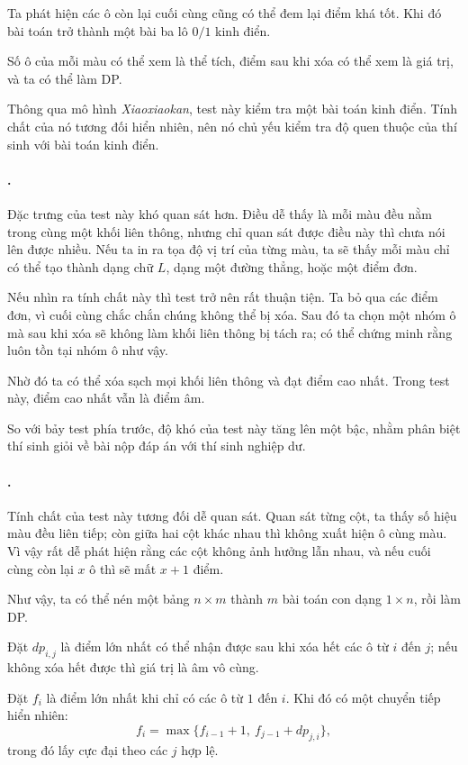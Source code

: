 \documentclass[11pt]{article}
\begin{document}
Ta phát hiện các ô còn lại cuối cùng cũng có thể đem lại điểm khá tốt. Khi đó
bài toán trở thành một bài ba lô \(0/1\) kinh điển.

Số ô của mỗi màu có thể xem là thể tích, điểm sau khi xóa có thể xem là giá
trị, và ta có thể làm DP.

Thông qua mô hình \emph{Xiaoxiaokan}, test này kiểm tra một bài toán kinh
điển. Tính chất của nó tương đối hiển nhiên, nên nó chủ yếu kiểm tra độ quen
thuộc của thí sinh với bài toán kinh điển.

\paragraph{.}
Đặc trưng của test này khó quan sát hơn. Điều dễ thấy là mỗi màu đều nằm trong
cùng một khối liên thông, nhưng chỉ quan sát được điều này thì chưa nói lên
được nhiều. Nếu ta in ra tọa độ vị trí của từng màu, ta sẽ thấy mỗi màu chỉ có
thể tạo thành dạng chữ \(L\), dạng một đường thẳng, hoặc một điểm đơn.

Nếu nhìn ra tính chất này thì test trở nên rất thuận tiện. Ta bỏ qua các điểm
đơn, vì cuối cùng chắc chắn chúng không thể bị xóa. Sau đó ta chọn một nhóm ô
mà sau khi xóa sẽ không làm khối liên thông bị tách ra; có thể chứng minh rằng
luôn tồn tại nhóm ô như vậy.

Nhờ đó ta có thể xóa sạch mọi khối liên thông và đạt điểm cao nhất. Trong test
này, điểm cao nhất vẫn là điểm âm.

So với bảy test phía trước, độ khó của test này tăng lên một bậc, nhằm phân
biệt thí sinh giỏi về bài nộp đáp án với thí sinh nghiệp dư.

\paragraph{.}
Tính chất của test này tương đối dễ quan sát. Quan sát từng cột, ta thấy số
hiệu màu đều liên tiếp; còn giữa hai cột khác nhau thì không xuất hiện ô cùng
màu. Vì vậy rất dễ phát hiện rằng các cột không ảnh hưởng lẫn nhau, và nếu
cuối cùng còn lại \(x\) ô thì sẽ mất \(x+1\) điểm.

Như vậy, ta có thể nén một bảng \(n\times m\) thành \(m\) bài toán con dạng
\(1\times n\), rồi làm DP.

Đặt \(dp_{i,j}\) là điểm lớn nhất có thể nhận được sau khi xóa hết các ô từ
\(i\) đến \(j\); nếu không xóa hết được thì giá trị là âm vô cùng.

Đặt \(f_i\) là điểm lớn nhất khi chỉ có các ô từ \(1\) đến \(i\). Khi đó có
một chuyển tiếp hiển nhiên:
\[
  f_i=\max\{f_{i-1}+1,\ f_{j-1}+dp_{j,i}\},
\]
trong đó lấy cực đại theo các \(j\) hợp lệ.
\end{document}

